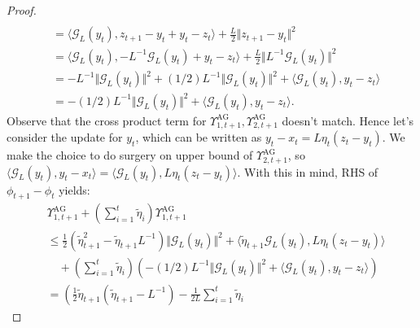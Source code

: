 \begin{proof}
\begin{align*}
            \\
            &= 
            \langle \mathcal G_L(y_t), z_{t + 1} - y_t + y_t - z_t\rangle
            + \frac{L}{2}\Vert z_{t + 1} - y_t\Vert^2
            \\
            &= 
            \langle \mathcal G_L(y_t), - L^{-1} \mathcal G_L(y_t) + y_t - z_t\rangle
            + 
            \frac{L}{2}\Vert L^{-1}\mathcal G_L(y_t)\Vert^2
            \\
            &= 
            -L^{-1}\Vert \mathcal G_L(y_t)\Vert^2 
            + 
            (1/2)L^{-1}\Vert \mathcal G_L(y_t)\Vert^2 
            + 
            \langle \mathcal G_L(y_t), y_t - z_t\rangle
            \\
            &= 
            -(1/2)L^{-1}\Vert \mathcal G_L(y_t)\Vert^2
            + 
            \langle \mathcal G_L(y_t), y_t - z_t\rangle. 
        \end{align*}
        Observe that the cross product term for $\Upsilon_{1, t + 1}^\text{AG}, \Upsilon_{2, t + 1}^\text{AG}$ doesn't match. 
        Hence let's consider the update for $y_t$, which can be written as $y_t - x_t = L \eta_t (z_t - y_t)$. We make the choice to do surgery on upper bound of $\Upsilon_{2, t + 1}^\text{AG}$, so $\langle \mathcal G_L(y_t), y_t - x_t\rangle = \langle \mathcal G_L(y_t), L \eta_t (z_t - y_t)\rangle$. 
        With this in mind, RHS of $\phi_{t + 1} - \phi_t$ yields: 
        {\footnotesize
        \begin{align*}
            &\Upsilon_{1, t + 1}^\text{AG} + 
            \left(
                \sum_{i = 1}^{t}\tilde\eta_i 
            \right)\Upsilon_{1, t + 1}^{\text{AG}}
            \\
            &\le 
            \frac{1}{2}\left(
                \tilde\eta_{t + 1}^2 - \tilde\eta_{t + 1}L^{-1}
            \right)\Vert \mathcal G_L(y_t)\Vert^2 
            + 
            \langle \tilde\eta_{t + 1} \mathcal G_L(y_t), L\eta_t(z_t - y_t)\rangle
            \\ 
            &\quad 
            + 
            \left(
                \sum_{i = 1}^{t}\tilde\eta_i 
            \right)\left(
                -(1/2)L^{-1}\Vert \mathcal G_L(y_t)\Vert^2
                + 
                \langle \mathcal G_L(y_t), y_t - z_t\rangle
            \right)
            \\
            &= 
            \left(
                \frac{1}{2}\tilde\eta_{t + 1}\left(
                    \tilde \eta_{t +1} - L^{-1}
                \right)
                - 
                \frac{1}{2L}\sum_{i = 1}^{t}\tilde \eta_i

\end{align*}}
\end{proof}
